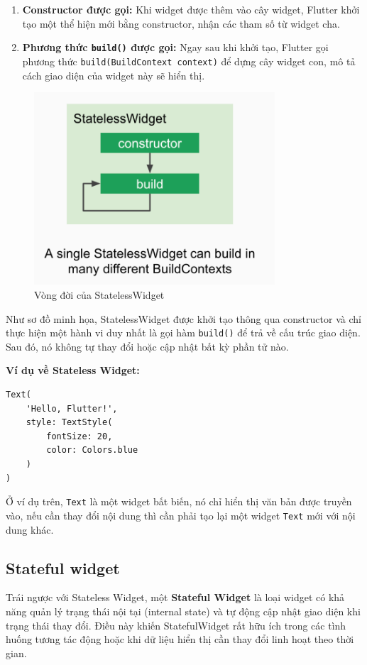 \documentclass[../DoAn.tex]{subfiles}
\numberwithin{figure}{chapter}
\begin{document}
\begin{enumerate}
\item \textbf{Constructor được gọi:} Khi widget được thêm vào cây widget, Flutter khởi tạo một thể hiện mới bằng constructor, nhận các tham số từ widget cha.
\item \textbf{Phương thức \texttt{build()} được gọi:} Ngay sau khi khởi tạo, Flutter gọi phương thức \texttt{build(BuildContext context)} để dựng cây widget con, mô tả cách giao diện của widget này sẽ hiển thị.
\end{enumerate}
\begin{figure}[H]
    \centering
    \includegraphics[width=0.8\textwidth]{Hinhve/Chuong5/statelesswidgetimg.png}
    \caption{Vòng đời của StatelessWidget}
    \label{fig:statelesswidgetimg}
\end{figure}
Như sơ đồ minh họa, StatelessWidget được khởi tạo thông qua constructor và chỉ thực hiện một hành vi duy nhất là gọi hàm \texttt{build()} để trả về cấu trúc giao diện. Sau đó, nó không tự thay đổi hoặc cập nhật bất kỳ phần tử nào.

\textbf{Ví dụ về Stateless Widget:}
\begin{lstlisting}
Text(
    'Hello, Flutter!', 
    style: TextStyle(
        fontSize: 20, 
        color: Colors.blue
    )
)
\end{lstlisting}


Ở ví dụ trên, \texttt{Text} là một widget bất biến, nó chỉ hiển thị văn bản được truyền vào, nếu cần thay đổi nội dung thì cần phải tạo lại một widget \texttt{Text} mới với nội dung khác.

\subsection{Stateful widget}
Trái ngược với Stateless Widget, một \textbf{Stateful Widget} là loại widget có khả năng quản lý trạng thái nội tại (internal state) và tự động cập nhật giao diện khi trạng thái thay đổi. Điều này khiến StatefulWidget rất hữu ích trong các tình huống tương tác động hoặc khi dữ liệu hiển thị cần thay đổi linh hoạt theo thời gian.
\end{document}
